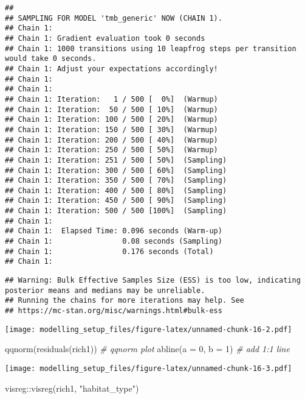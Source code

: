 \documentclass[
]{article}
\newenvironment{Shaded}{\begin{snugshade}}{\end{snugshade}}
\newcommand{\AttributeTok}[1]{\textcolor[rgb]{0.77,0.63,0.00}{#1}}
\newcommand{\CommentTok}[1]{\textcolor[rgb]{0.56,0.35,0.01}{\textit{#1}}}
\newcommand{\DecValTok}[1]{\textcolor[rgb]{0.00,0.00,0.81}{#1}}
\newcommand{\FunctionTok}[1]{\textcolor[rgb]{0.00,0.00,0.00}{#1}}
\newcommand{\NormalTok}[1]{#1}
\newcommand{\SpecialCharTok}[1]{\textcolor[rgb]{0.00,0.00,0.00}{#1}}
\newcommand{\StringTok}[1]{\textcolor[rgb]{0.31,0.60,0.02}{#1}}
\begin{document}
\begin{verbatim}
## 
## SAMPLING FOR MODEL 'tmb_generic' NOW (CHAIN 1).
## Chain 1: 
## Chain 1: Gradient evaluation took 0 seconds
## Chain 1: 1000 transitions using 10 leapfrog steps per transition would take 0 seconds.
## Chain 1: Adjust your expectations accordingly!
## Chain 1: 
## Chain 1: 
## Chain 1: Iteration:   1 / 500 [  0%]  (Warmup)
## Chain 1: Iteration:  50 / 500 [ 10%]  (Warmup)
## Chain 1: Iteration: 100 / 500 [ 20%]  (Warmup)
## Chain 1: Iteration: 150 / 500 [ 30%]  (Warmup)
## Chain 1: Iteration: 200 / 500 [ 40%]  (Warmup)
## Chain 1: Iteration: 250 / 500 [ 50%]  (Warmup)
## Chain 1: Iteration: 251 / 500 [ 50%]  (Sampling)
## Chain 1: Iteration: 300 / 500 [ 60%]  (Sampling)
## Chain 1: Iteration: 350 / 500 [ 70%]  (Sampling)
## Chain 1: Iteration: 400 / 500 [ 80%]  (Sampling)
## Chain 1: Iteration: 450 / 500 [ 90%]  (Sampling)
## Chain 1: Iteration: 500 / 500 [100%]  (Sampling)
## Chain 1: 
## Chain 1:  Elapsed Time: 0.096 seconds (Warm-up)
## Chain 1:                0.08 seconds (Sampling)
## Chain 1:                0.176 seconds (Total)
## Chain 1:
\end{verbatim}

\begin{verbatim}
## Warning: Bulk Effective Samples Size (ESS) is too low, indicating posterior means and medians may be unreliable.
## Running the chains for more iterations may help. See
## https://mc-stan.org/misc/warnings.html#bulk-ess
\end{verbatim}

\texttt{[image: modelling\_setup\_files/figure-latex/unnamed-chunk-16-2.pdf]}

\begin{Shaded}
\begin{Highlighting}[]
\FunctionTok{qqnorm}\NormalTok{(}\FunctionTok{residuals}\NormalTok{(rich1)) }\CommentTok{\# qqnorm plot}
\FunctionTok{abline}\NormalTok{(}\AttributeTok{a =} \DecValTok{0}\NormalTok{, }\AttributeTok{b =} \DecValTok{1}\NormalTok{) }\CommentTok{\# add 1:1 line}
\end{Highlighting}
\end{Shaded}

\texttt{[image: modelling\_setup\_files/figure-latex/unnamed-chunk-16-3.pdf]}

\begin{Shaded}
\begin{Highlighting}[]
\NormalTok{visreg}\SpecialCharTok{::}\FunctionTok{visreg}\NormalTok{(rich1, }\StringTok{"habitat\_type"}\NormalTok{)}
\end{Highlighting}
\end{Shaded}
\end{document}
